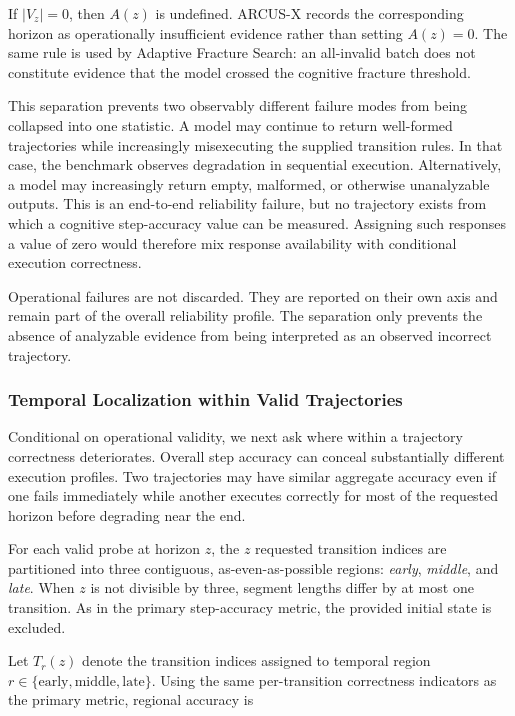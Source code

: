 \documentclass{article}
\begin{document}
If $|V_z|=0$, then $A(z)$ is undefined. ARCUS-X records the corresponding
horizon as operationally insufficient evidence rather than setting
$A(z)=0$. The same rule is used by Adaptive Fracture Search: an all-invalid
batch does not constitute evidence that the model crossed the cognitive
fracture threshold.

This separation prevents two observably different failure modes from being
collapsed into one statistic. A model may continue to return well-formed
trajectories while increasingly misexecuting the supplied transition rules. In
that case, the benchmark observes degradation in sequential execution.
Alternatively, a model may increasingly return empty, malformed, or otherwise
unanalyzable outputs. This is an end-to-end reliability failure, but no
trajectory exists from which a cognitive step-accuracy value can be measured.
Assigning such responses a value of zero would therefore mix response
availability with conditional execution correctness.

Operational failures are not discarded. They are reported on their own axis
and remain part of the overall reliability profile. The separation only
prevents the absence of analyzable evidence from being interpreted as an
observed incorrect trajectory.

\subsubsection{Temporal Localization within Valid Trajectories}
\label{app:temporal_localization}

Conditional on operational validity, we next ask where within a trajectory
correctness deteriorates. Overall step accuracy can conceal substantially
different execution profiles. Two trajectories may have similar aggregate
accuracy even if one fails immediately while another executes correctly for
most of the requested horizon before degrading near the end.

For each valid probe at horizon $z$, the $z$ requested transition indices are
partitioned into three contiguous, as-even-as-possible regions:
\emph{early}, \emph{middle}, and \emph{late}. When $z$ is not divisible by
three, segment lengths differ by at most one transition. As in the primary
step-accuracy metric, the provided initial state is excluded.

Let $T_r(z)$ denote the transition indices assigned to temporal region
$r \in \{\mathrm{early},\mathrm{middle},\mathrm{late}\}$. Using the same
per-transition correctness indicators as the primary metric, regional accuracy
is
\end{document}
